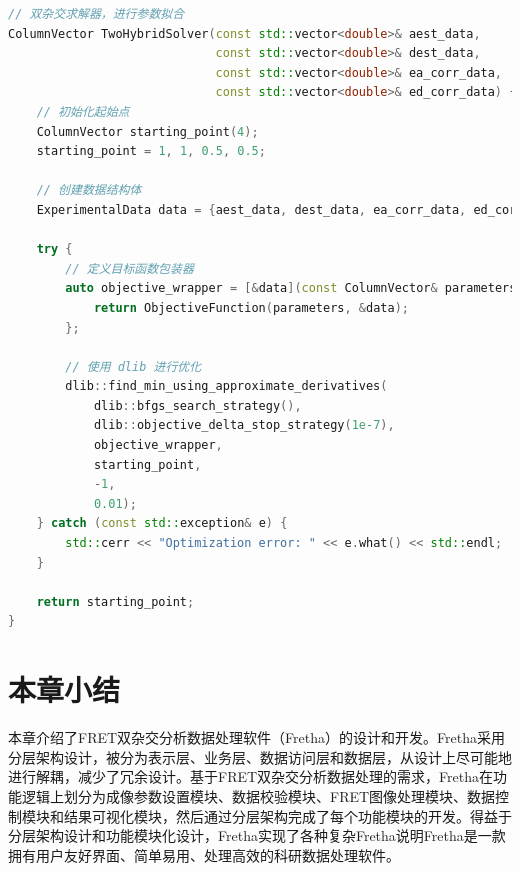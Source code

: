 \begin{lstlisting}[language=C++, caption={基于dlib的FRET双杂交求解器代码片段}]
// 双杂交求解器，进行参数拟合
ColumnVector TwoHybridSolver(const std::vector<double>& aest_data,
                             const std::vector<double>& dest_data,
                             const std::vector<double>& ea_corr_data,
                             const std::vector<double>& ed_corr_data) {
    // 初始化起始点
    ColumnVector starting_point(4);
    starting_point = 1, 1, 0.5, 0.5;

    // 创建数据结构体
    ExperimentalData data = {aest_data, dest_data, ea_corr_data, ed_corr_data};

    try {
        // 定义目标函数包装器
        auto objective_wrapper = [&data](const ColumnVector& parameters) {
            return ObjectiveFunction(parameters, &data);
        };

        // 使用 dlib 进行优化
        dlib::find_min_using_approximate_derivatives(
            dlib::bfgs_search_strategy(),
            dlib::objective_delta_stop_strategy(1e-7),
            objective_wrapper,
            starting_point,
            -1,
            0.01);
    } catch (const std::exception& e) {
        std::cerr << "Optimization error: " << e.what() << std::endl;
    }

    return starting_point;
}
\end{lstlisting}




\section{本章小结}

\ifshowtext
本章介绍了FRET双杂交分析数据处理软件（Fretha）的设计和开发。Fretha采用分层架构设计，被分为表示层、业务层、数据访问层和数据层，从设计上尽可能地进行解耦，减少了冗余设计。基于FRET双杂交分析数据处理的需求，Fretha在功能逻辑上划分为成像参数设置模块、数据校验模块、FRET图像处理模块、数据控制模块和结果可视化模块，然后通过分层架构完成了每个功能模块的开发。得益于分层架构设计和功能模块化设计，Fretha实现了各种复杂Fretha说明Fretha是一款拥有用户友好界面、简单易用、处理高效的科研数据处理软件。
\fi